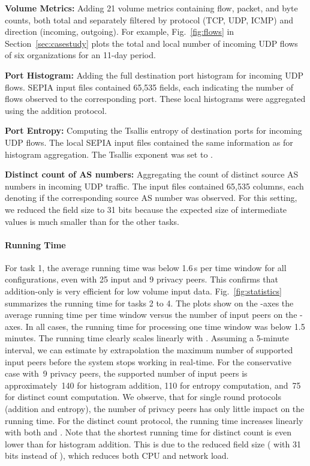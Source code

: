 \documentclass[letterpaper,11pt,onecolumn,titlepage]{article}
\begin{document}
\vspace{1mm}
\begin{compactenum}
\item \textbf{Volume Metrics:} Adding 21 volume metrics containing flow, packet, and
byte counts, both total and separately filtered by protocol (TCP,
UDP, ICMP) and direction (incoming, outgoing). For example,
Fig.~\ref{fig:flows} in Section~\ref{sec:casestudy} plots the total and local number of 
incoming UDP flows of six organizations for an 11-day period. 


\item \textbf{Port Histogram:} Adding the full destination port histogram for
incoming UDP flows. SEPIA input files contained 65,535 fields, 
each indicating the number of flows observed
to the corresponding port. These local histograms were
aggregated using the addition protocol.

\item \textbf{Port Entropy:} Computing the Tsallis entropy of destination ports
for incoming UDP flows. The local SEPIA input files contained the
same information as for histogram aggregation. The Tsallis exponent  was set to .  

\item \textbf{Distinct count of AS numbers:} Aggregating the count of distinct source
AS numbers in incoming UDP traffic. The input files contained
65,535 columns, each denoting if the corresponding source AS
number was observed. 
For this setting, we reduced the field size  to 31 bits because
the expected size of intermediate values is much smaller than for the other tasks.


\end{compactenum}
\vspace{1mm}

\paragraph{Running Time}
For task 1, the average running time was below 1.6\,s per time window for
all configurations, even with 25 input and 9 privacy peers. This confirms
that addition-only is very efficient for low volume input data.
Fig.~\ref{fig:statistics} summarizes the running time for tasks 2 to 4. The
plots show on the -axes the average running time per
time window versus the number of input peers on the -axes. 
In all cases, the running time for processing one
time window was below 1.5 minutes.
The running time clearly scales linearly with
. Assuming a 5-minute interval, we can estimate by
extrapolation the maximum number of supported input peers before the system
stops working in real-time. For the conservative case with~9
privacy peers, the supported number of input peers is approximately~140 for histogram addition,
110 for entropy computation, and~75 for distinct count computation.
We observe, that for single round protocols (addition and entropy),  
the number of privacy peers has only little impact on the running time. 
For the distinct count protocol, the running time increases linearly with both  and . 
Note that the shortest running time for distinct count is even lower than for histogram
addition. This is due to the reduced field size ( with 31 bits instead of ), which reduces both CPU and network
load.
\end{document}
